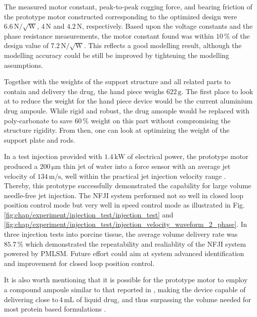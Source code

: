             
            The measured motor constant, peak-to-peak cogging force, and bearing friction of the prototype motor constructed corresponding to the optimized design were $6.6\,\mathrm{N/\sqrt{W}}$, $4\,\mathrm{N}$ and $4.2\,\mathrm{N}$, respectively. Based upon the voltage constants and the phase resistance measurements, the motor constant found was within $10\,\%$ of the design value of $7.2\,\mathrm{N/ \sqrt{ \mathrm{W}}}$. This reflects a good modelling result, although the modelling accuracy could be still be improved by tightening the modelling assumptions. 
            
            
            Together with the weights of the support structure and all related parts to contain and delivery the drug, the hand piece weighs $622\,\mathrm{g}$. The first place to look at to reduce the weight for the hand piece device would be the current aluminium drug ampoule. While rigid and robust, the drug amouple would be replaced with  poly-carbonate to save $60\,\%$ weight on this part without compromising the structure rigidity. From then, one can look at optimizing the weight of the support plate and rods. 
            
            
            In a test injection provided with $1.4\,\mathrm{kW}$ of electrical power, the prototype motor produced a $200\,\mathrm{\mu m}$ thin jet of water into a force sensor with an average jet velocity of $134\,\mathrm{m/s}$, well within the practical jet injection velocity range \cite{mitragotri2006}. Thereby, this prototype successfully demonstrated the capability for large volume needle-free jet injection. The \acs{NFJI} system performed not so well in closed loop position control mode but very well in speed control mode as illustrated in Fig.\,\ref{fig:chap/experiment/injection_test/injection_test} and \ref{fig:chap/experiment/injection_test/injection_velocity_waveform_2_phase}. In three injection tests into porcine tissue, the average volume delivery rate was $85.7\,\%$ which demonstrated the repeatability and realiablity of the \acs{NFJI} system powered by \acs{PMLSM}. Future effort could aim at system advanced identification and improvement for closed loop position control. 
            
            
            It is also worth mentioning that it is possible for the prototype motor to employ a compound ampoule similar to that reported in \cite{Ruddy2015a,McKeage2018}, making the device capable of delivering close to\,$4\,\mathrm{mL}$ of liquid drug, and thus surpassing the volume needed for most protein based formulations \cite{Hogan2015a}.